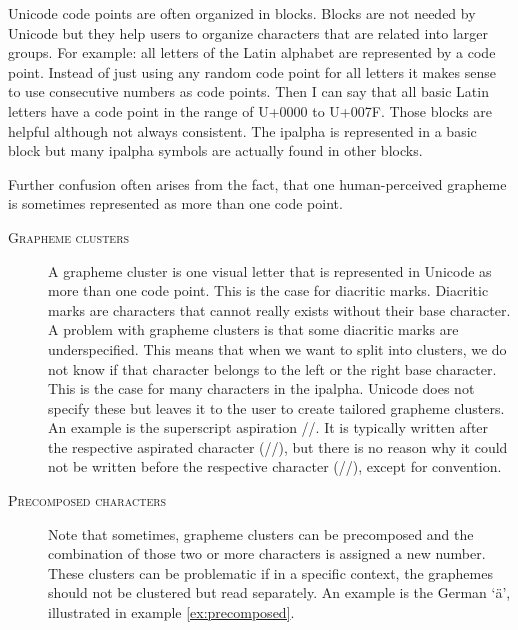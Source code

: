Unicode code points are often organized in blocks. Blocks are not needed by Unicode but they help users to organize characters that are related into larger groups. For example: all letters of the Latin alphabet are represented by a code point. Instead of just using any random code point for all letters it makes sense to use consecutive numbers as code points. Then I can say that all basic Latin letters have a code point in the range of U+0000 to U+007F. Those blocks are helpful although not always consistent. The \ac{ipalpha} is represented in a basic block but many \ac{ipalpha} symbols are actually found in other blocks. 

Further confusion often arises from the fact, that one human-perceived grapheme is sometimes represented as more than one code point. 

\begin{description}
\item[\textsc{Grapheme clusters}] A grapheme cluster is one visual letter that is represented in Unicode as more than one code point. This is the case for diacritic marks. Diacritic marks are characters that cannot really exists without their base character. A problem with grapheme clusters is that some diacritic marks are underspecified. This means that when we want to split into clusters, we do not know if that character belongs to the left or the right base character. This is the case for many characters in the \ac{ipalpha}. Unicode does not specify these but leaves it to the user to create tailored grapheme clusters. An example is the superscript aspiration //. It is typically written after the respective aspirated character (//), but there is no reason why it could not be written before the respective character (//), except for convention.
\item[\textsc{Precomposed characters}] Note that sometimes, grapheme clusters can be precomposed and the combination of those two or more characters is assigned a new number. These clusters can be problematic if in a specific context, the graphemes should not be clustered but read separately. An example is the German `ä', illustrated in example \ref{ex:precomposed}.


\end{description} 

